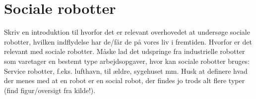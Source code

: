 \chapter{Sociale robotter}
\label{SocialRobot}
%
Skriv en introduktion til hvorfor det er relevant overhovedet at undersøge sociale robotter, hvilken indflydelse har de/får de på vores liv i fremtiden. Hvorfor er det relevant med sociale robotter. Måske lad det udspringe fra industrielle robotter som varetager en bestemt type arbejdsopgaver, hvor kan sociale robotter bruges: Service robotter, f.eks. lufthavn, til ældre, sygehuset mm. Husk at definere hvad der menes med at en robot er en social robot, der findes jo trods alt flere typer (find figur/oversigt fra kilde!).
